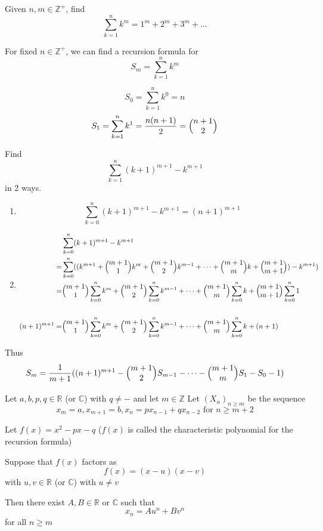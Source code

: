 
\begin{exmp}
Given $n,m\in\mathbb{Z}^+$, find \[\sum_{k=1}^n k^m = 1^m+2^m+3^m+\dots\]
\end{exmp}

\begin{solution}
For fixed $n\in \mathbb{Z}^+$, we can find a recursion formula for \[S_m = \sum_{k=1}^n k^m\]

\[S_0 = \sum_{k=1}^n k^0 = n\]
\[S_1 = \sum_{k=1}^n k^1 = \frac{n(n+1)}{2} = \mybinom{n+1}{2}\]

Find \[\sum_{k=1}^n (k+1)^{m+1} - k^{m+1}\] in 2 ways.

\begin{enumerate}
\item
\[\sum_{k=0}^n (k+1)^{m+1} - k^{m+1} = (n+1)^{m+1}\]

\item
\begin{align*}
    &\sum_{k=0}^n (k+1)^{m+1} - k^{m+1} \\
    = & \sum_{k=0}^n ((k^{m+1} + \mybinom{m+1}{1}k^m +  \mybinom{m+1}{2}k^{m-1} + \dots + \mybinom{m+1}{m} k + \mybinom{m+1}{m+1}) - k^{m+1})\\
    =&\mybinom{m+1}{1} \sum_{k=0}^n k^m + \mybinom{m+1}{2} \sum_{k=0}^n k^{m-1} + \dots + \mybinom{m+1}{m} \sum_{k=0}^n k + \mybinom{m+1}{m+1}  \sum_{k=0}^n 1 \\
    \\
    (n+1)^{m+1} = & \mybinom{m+1}{1} \sum_{k=0}^n k^m  + \mybinom{m+1}{2} \sum_{k=0}^n k^{m-1} + \dots + \mybinom{m+1}{m} \sum_{k=0}^n  k + (n+1) \\
\end{align*}

\end{enumerate}

Thus \[S_m = \frac{1}{m+1} ((n+1)^{m+1} - \mybinom{m+1}{2} S_{m-1} - \dots - \mybinom{m+1}{m} S_1 - S_0 - 1)\]
\end{solution}


\begin{thm}
Let $a,b,p,q\in\mathbb{R}$ (or $\mathbb{C}$) with $q\neq -$ and let $m\in\mathbb{Z}$
Let $(X_n)_{n\geq m}$ be the sequence 
\[x_m = a, x_{m+1} = b, x_n = px_{n-1}+qx_{n-2} \text{ for } n\geq m+2\]

Let $f(x) = x^2 - px - q$ ($f(x)$ is called the characteristic polynomial for the recursion formula)

Suppose that $f(x)$ factors as \[f(x) = (x-u)(x-v)\]
with $u,v\in\mathbb{R}$ (or $\mathbb{C}$) with $u\neq v$

Then there exist $A,B\in \mathbb{R}$ or $\mathbb{C}$ such that 
\[x_n = Au^n + Bv^n\] for all $n\geq m$
\end{thm}

